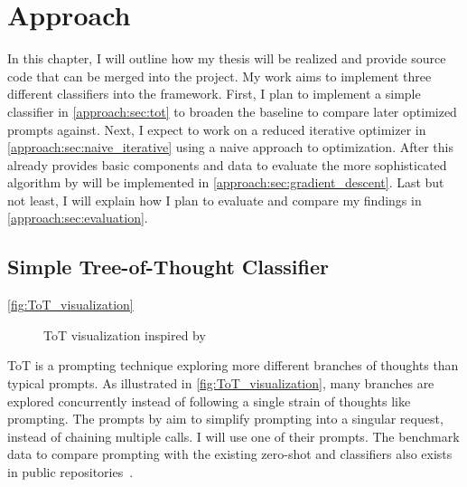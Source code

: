 \chapter{Approach}
\label{ch:Approach}
In this chapter, I will outline how my thesis will be realized and provide source code that can be merged into the \LiSSA project.
My work aims to implement three different classifiers into the framework.
First, I plan to implement a simple \ToT classifier in \autoref{approach:sec:tot} to broaden the baseline to compare later optimized prompts against.
Next, I expect to work on a reduced iterative optimizer in \autoref{approach:sec:naive_iterative} using a naive approach to optimization.
After this already provides basic components and data to evaluate the more sophisticated algorithm by  will be implemented in \autoref{approach:sec:gradient_descent}.
Last but not least, I will explain how I plan to evaluate and compare my findings in \autoref{approach:sec:evaluation}.

\section{Simple Tree-of-Thought Classifier}
\label{approach:sec:tot}

\autoref{fig:ToT_visualization} 

\begin{figure}
    \centering
    
    \caption{\Ac{ToT} visualization inspired by }
    \label{fig:ToT_visualization}
\end{figure}

\Ac{ToT} is a prompting technique exploring more different branches of thoughts than typical \CoT prompts.
As illustrated in \autoref{fig:ToT_visualization}, many branches are explored concurrently instead of following a single strain of thoughts like \CoT prompting.
The prompts by  aim to simplify \ToT prompting into a singular request, instead of chaining multiple calls.
I will use one of their prompts.
The benchmark data to compare \ToT prompting with the existing zero-shot and \CoT classifiers also exists in public repositories~\cite{fuchss2022ArDoCoBenchmark, hey2025ReplicationPackage}.

